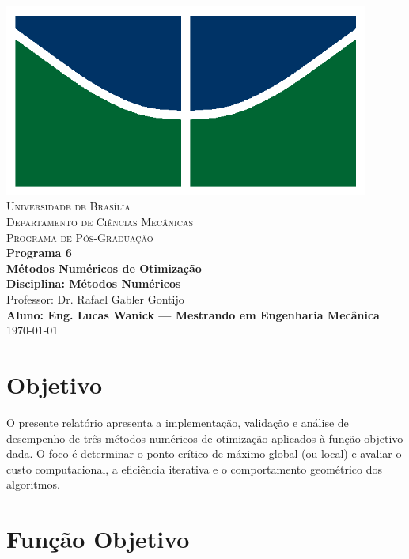 \documentclass[12pt]{article}
\begin{document}
\begin{titlepage}
    \centering
    \includegraphics[width=12cm]{img/unb_bandeira.png} \\
    \vspace{1cm}
    \textsc{\Large Universidade de Bras\'ilia} \\
    \textsc{Departamento de Ciências Mec\^anicas} \\
    \textsc{Programa de P\'os-Gradua\c{c}\~ao} \\
    \vfill
    {\Large\bfseries Programa 6} \\
    \vspace{0.5cm}
    {\Large\bfseries Métodos Numéricos de Otimização} \\
    \vspace{0.5cm}
    \textbf{Disciplina: M\'etodos Num\'ericos} \\
    Professor: Dr. Rafael Gabler Gontijo \\
    \vfill
    \textbf{Aluno: Eng. Lucas Wanick — Mestrando em Engenharia Mec\^anica} \\
    \vspace{0.5cm}
        \today \\
\end{titlepage}

\section*{Objetivo}

O presente relatório apresenta a implementação, validação e análise de desempenho de três métodos numéricos de otimização aplicados à função objetivo dada. O foco é determinar o ponto crítico de máximo global (ou local) e avaliar o custo computacional, a eficiência iterativa e o comportamento geométrico dos algoritmos.

\section*{Função Objetivo}
\end{document}
